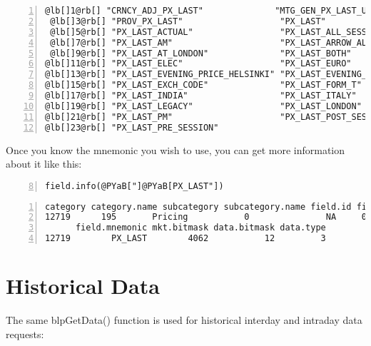 \documentclass[a4paper]{article}
\begin{document}
\begin{Verbatim}[commandchars=@\[\],numbers=left,firstnumber=1,stepnumber=1]
 @lb[]1@rb[] "CRNCY_ADJ_PX_LAST"              "MTG_GEN_PX_LAST_UPDATE"        
 @lb[]3@rb[] "PROV_PX_LAST"                   "PX_LAST"                       
 @lb[]5@rb[] "PX_LAST_ACTUAL"                 "PX_LAST_ALL_SESSIONS"          
 @lb[]7@rb[] "PX_LAST_AM"                     "PX_LAST_ARROW_ALL_SESSION"     
 @lb[]9@rb[] "PX_LAST_AT_LONDON"              "PX_LAST_BOTH"                  
@lb[]11@rb[] "PX_LAST_ELEC"                   "PX_LAST_EURO"                  
@lb[]13@rb[] "PX_LAST_EVENING_PRICE_HELSINKI" "PX_LAST_EVENING_TRADE_HELSINKI"
@lb[]15@rb[] "PX_LAST_EXCH_CODE"              "PX_LAST_FORM_T"                
@lb[]17@rb[] "PX_LAST_INDIA"                  "PX_LAST_ITALY"                 
@lb[]19@rb[] "PX_LAST_LEGACY"                 "PX_LAST_LONDON"                
@lb[]21@rb[] "PX_LAST_PM"                     "PX_LAST_POST_SESSION"          
@lb[]23@rb[] "PX_LAST_PRE_SESSION"           
\end{Verbatim}

    

Once you know the mnemonic you wish to use, you can get more information about it like this:

\begin{Verbatim}[commandchars=@\[\],numbers=left,firstnumber=8,stepnumber=1]
field.info(@PYaB["]@PYaB[PX_LAST"])
\end{Verbatim}

    

\begin{Verbatim}[commandchars=@\[\],numbers=left,firstnumber=1,stepnumber=1]
      category category.name subcategory subcategory.name field.id field.name
12719      195       Pricing           0               NA     0560 Last Price
      field.mnemonic mkt.bitmask data.bitmask data.type
12719        PX_LAST        4062           12         3
\end{Verbatim}

    



\section{Historical Data} %
\label{sec:historical_data}

The same blpGetData() function is used for historical interday and intraday data requests:
\end{document}
